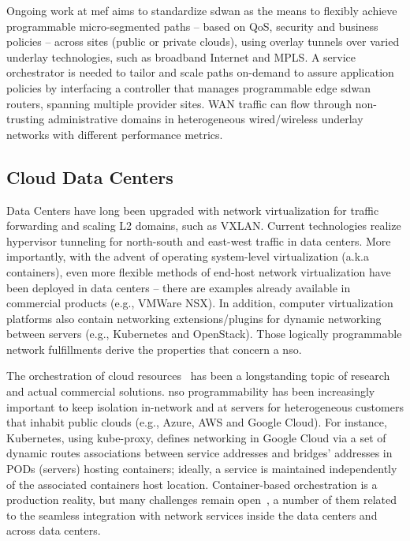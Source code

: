 Ongoing work at \gls{mef} aims to standardize \gls{sdwan} \cite{MEF:SDWAN:2017}  as the means to flexibly achieve programmable micro-segmented paths -- based on QoS, security and business policies -- across sites (public or private clouds), using overlay tunnels over varied underlay technologies, such as broadband Internet and MPLS. A service orchestrator is needed to tailor and scale paths on-demand to assure application policies by interfacing a controller that manages programmable edge \gls{sdwan} routers, spanning multiple provider sites. WAN traffic can flow through non-trusting administrative domains in heterogeneous wired/wireless underlay networks with different performance metrics.

\subsection{Cloud Data Centers}

Data Centers have long been upgraded with network virtualization for traffic forwarding and scaling L2 domains, such as VXLAN. Current technologies realize hypervisor tunneling for north-south and east-west traffic in data centers. More importantly, with the advent of operating system-level virtualization (a.k.a containers), even more flexible methods of end-host network virtualization have been deployed in data centers -- there are examples already available in commercial products (e.g., VMWare NSX). In addition, computer virtualization platforms also contain networking extensions/plugins for dynamic networking between servers (e.g., Kubernetes and OpenStack). Those logically programmable network fulfillments derive the properties that concern a \gls{nso}.

The orchestration of cloud resources~\cite{liu2011cloud} has been a longstanding topic of research and actual commercial solutions.  \gls{nso} programmability has been increasingly important to keep isolation in-network and at servers for heterogeneous customers that inhabit public clouds (e.g., Azure, AWS and Google Cloud). For instance, Kubernetes, using kube-proxy, defines networking in Google Cloud via a set of dynamic routes associations between service addresses and bridges' addresses in PODs (servers) hosting containers; ideally, a service is maintained independently of the associated containers host location. Container-based orchestration is a production reality, but many challenges remain open~\cite{7185168}, a number of them related to the seamless integration with network services inside the data centers and across data centers.

